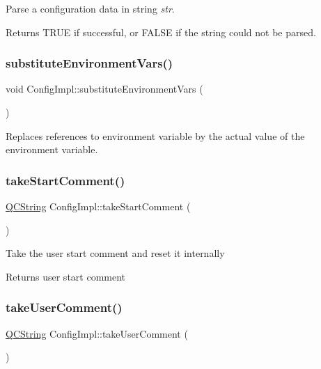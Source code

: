 Parse a configuration data in string {\itshape str}. \begin{DoxyReturn}{Returns}
T\+R\+UE if successful, or F\+A\+L\+SE if the string could not be parsed. 
\end{DoxyReturn}
\mbox{\label{class_config_impl_a56797aabb7ab52c9bd60f32634e41a5b}} 
\subsubsection{\texorpdfstring{substituteEnvironmentVars()}{substituteEnvironmentVars()}}
{\footnotesize\ttfamily void Config\+Impl\+::substitute\+Environment\+Vars (\begin{DoxyParamCaption}{ }\end{DoxyParamCaption})}

Replaces references to environment variable by the actual value of the environment variable. \mbox{\label{class_config_impl_a6e909c1b38e02a4536e16a33790ddca0}} 
\subsubsection{\texorpdfstring{takeStartComment()}{takeStartComment()}}
{\footnotesize\ttfamily \mbox{\hyperlink{class_q_c_string}{Q\+C\+String}} Config\+Impl\+::take\+Start\+Comment (\begin{DoxyParamCaption}{ }\end{DoxyParamCaption})\hspace{0.3cm}{\ttfamily [inline]}}

Take the user start comment and reset it internally \begin{DoxyReturn}{Returns}
user start comment 
\end{DoxyReturn}
\mbox{\label{class_config_impl_a998060bb7c8a5948956b7ccf192d62da}} 
\subsubsection{\texorpdfstring{takeUserComment()}{takeUserComment()}}
{\footnotesize\ttfamily \mbox{\hyperlink{class_q_c_string}{Q\+C\+String}} Config\+Impl\+::take\+User\+Comment (\begin{DoxyParamCaption}{ }\end{DoxyParamCaption})\hspace{0.3cm}{\ttfamily [inline]}}


